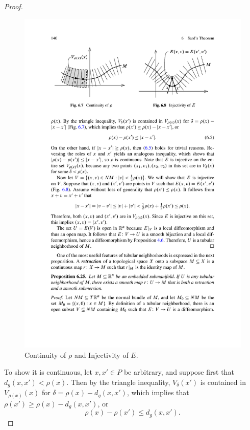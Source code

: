 \begin{proof}
\begin{figure}[htbp]
\includegraphics{pictures/tubular}
\caption{Continuity of $\rho$ and Injectivity of $E$.}
\end{figure}\par
To show it is continuous, let $x,x'\in P$ be arbitrary, and suppose first that $d_g(x,x')<\rho(x)$. Then by the triangle inequality, $V_\delta(x')$ is contained in 
$V_{\rho(x)}(x)$ for $\delta=\rho(x)-d_g(x,x')$, which implies that $\rho(x')\geq\rho(x)-d_g(x,x')$, or
\[\rho(x)-\rho(x')\leq d_g(x,x').\]


\end{proof}

